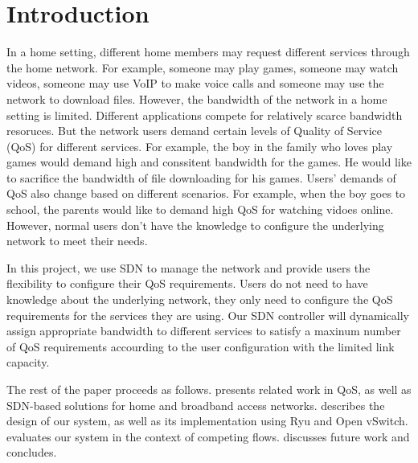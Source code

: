 \section{Introduction}

                                                                                           
In a home setting, different home members may request different services through the home network. For example, someone may play games, someone may watch videos, someone may use VoIP to make voice calls and someone may use the network to download files.   
However, the bandwidth of the network in a home setting is limited. Different applications compete for relatively scarce bandwidth resoruces. But the network users demand certain levels of Quality of Service (QoS) for different services. For example, the boy in the family who loves play games would demand high and conssitent bandwidth for the games. He would like to sacrifice the bandwidth of file downloading for his games. 
Users' demands of QoS also change based on different scenarios. For example, when the boy goes to school, the parents would like to demand high QoS for watching vidoes online. However, normal users don't have the knowledge to configure the underlying network to meet their needs.

In this project, we use SDN to manage the network and provide users the flexibility to configure their QoS requirements. Users do not need to have knowledge about the underlying network, they only need to configure the QoS requirements for the services they are using. Our SDN controller will dynamically assign appropriate bandwidth to different services to satisfy a maxinum number of QoS requirements accourding to the user configuration with the limited link capacity. 

The rest of the paper proceeds as follows. 
 presents related work in QoS, as well as SDN-based solutions
for home and broadband access networks. 
 describes the design of our system, as well as its implementation using Ryu and Open vSwitch.
 evaluates
our system in the
context of competing flows.  discusses future work
and concludes.

